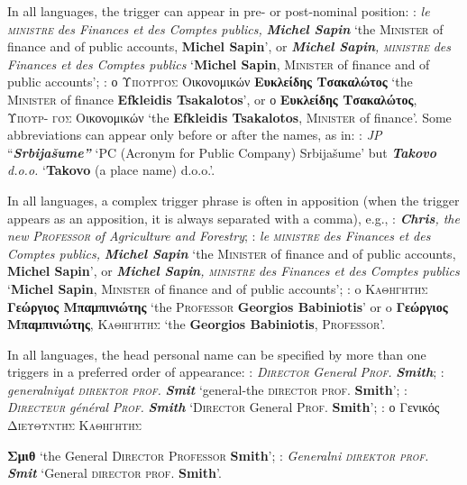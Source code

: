 \documentclass[output=paper]{langsci/langscibook}
\newcommand{\trigger}[1]{\textsc{#1}}
\begin{document}
{In all languages, the trigger can appear in pre- or post-nominal
position: : \textit{le }\textit{\trigger{ministre}} \textit{des
Finances et des Comptes publics, }\textbf{\textit{Michel Sapin }}‘the
\trigger{Minister} of finance and of public accounts, \textbf{Michel
Sapin}’,\textbf{ }or \textbf{\textit{Michel Sapin}}\textit{,
}\textit{\trigger{ministre}} \textit{des Finances et des Comptes publics
}‘\textbf{Michel Sapin}, \trigger{Minister} of finance and of public
accounts’; : ο \trigger{Υπουργός} Οικονομικών
\textbf{Ευκλείδης Τσακαλώτος} ‘the \trigger{Minister}
of finance \textbf{Efkleidis Tsakalotos}’, or ο
\textbf{Ευκλείδης Τσακαλώτος},
\trigger{Υπουρ-} \trigger{γός} Οικονομικών ‘the \textbf{Efkleidis
Tsakalotos}, \trigger{Minister} of finance’. Some abbreviations can
appear only before or after the names, as in: : \textit{\trigger{JP}}
“\textbf{\textit{Srbijašume”}} ‘PC (Acronym for Public Company)
Srbijašume’ but \textbf{\textit{Takovo}} \textit{d.o.o.}
‘\textbf{Takovo} (a place name) d.o.o.’.



In all languages, a complex trigger phrase is often in apposition (when
the trigger appears as an apposition, it is always separated with a
comma), e.g., : \textbf{\textit{Chris}}\textit{, the new
}\textit{\trigger{Professor}} \textit{of Agriculture and Forestry}; :
\textit{le }\textit{\trigger{ministre}} \textit{des Finances et des
Comptes publics, }\textbf{\textit{Michel Sapin }}‘the \trigger{Minister}
of finance and of public accounts, \textbf{Michel Sapin}’,\textbf{ }or
\textbf{\textit{Michel Sapin}}\textit{, }\textit{\trigger{ministre}}
\textit{des Finances et des Comptes publics }‘\textbf{Michel
Sapin},\textbf{ }\trigger{Minister} of finance and of public accounts’;
: o \trigger{Καθηγητής} \textbf{Γεώργιος
Μπαμπινιώτης} ‘the \trigger{Professor} \textbf{Georgios Babiniotis}’ or
o \textbf{Γεώργιος Μπαμπινιώτης},
\trigger{Καθηγητής} ‘the \textbf{Georgios Babiniotis},
\trigger{Professor}’.



In all languages, the head personal name can be specified by more than
one triggers in a preferred order of appearance: :
\textit{\trigger{Director}} \textit{General }\textit{\trigger{Prof.}}
\textbf{\textit{Smith}}; : \textit{generalniyat
}\textit{\trigger{direktor}} \textit{\trigger{prof.}} \textbf{\textit{Smit
}} `general-the \trigger{director} \trigger{prof.} \textbf{Smith}';\textit{
}: \textit{\trigger{Directeur}} \textit{général }\textit{\trigger{Prof.}}
\textbf{\textit{Smith }}`\trigger{Director} General \trigger{Prof.}
\textbf{Smith}'; : ο Γενικός \trigger{Διευθυντής Καθηγητής}} \textbf{Σμιθ} `the General
\trigger{Director} \trigger{Professor} \textbf{Smith}'; :
\textit{Generalni }\textit{\trigger{direktor}} \textit{\trigger{prof.}}
\textbf{\textit{Smit }}`General \trigger{director} \trigger{prof.}
\textbf{Smith}'.
\end{document}
